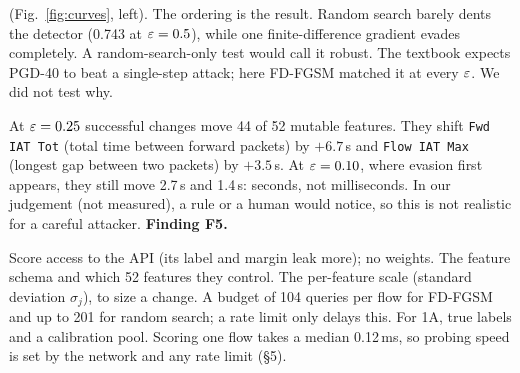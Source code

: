  (Fig.~\ref{fig:curves}, left). The ordering is the result. Random search barely dents the detector (0.743 at $\varepsilon=0.5$), while one finite-difference gradient evades completely. A random-search-only test would call it robust. The textbook expects PGD-40 to beat a single-step attack; here FD-FGSM matched it at every $\varepsilon$. We did not test why.

 At $\varepsilon=0.25$ successful changes move 44 of 52 mutable features. They shift \texttt{Fwd IAT Tot} (total time between forward packets) by $+6.7$\,s and \texttt{Flow IAT Max} (longest gap between two packets) by $+3.5$\,s. At $\varepsilon=0.10$, where evasion first appears, they still move 2.7\,s and 1.4\,s: seconds, not milliseconds. In our judgement (not measured), a rule or a human would notice, so this is not realistic for a careful attacker. \textbf{Finding F5.}

 Score access to the API (its label and margin leak more); no weights. The feature schema and which 52 features they control. The per-feature scale (standard deviation $\sigma_j$), to size a change. A budget of 104 queries per flow for FD-FGSM and up to 201 for random search; a rate limit only delays this. For 1A, true labels and a calibration pool. Scoring one flow takes a median 0.12\,ms, so probing speed is set by the network and any rate limit (\S5).

